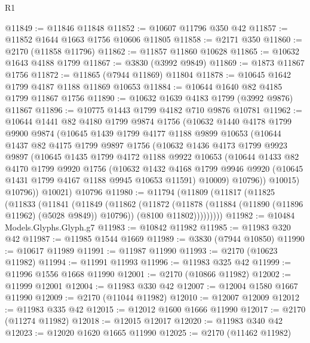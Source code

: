 \begin{lexlean}{R1}
\begin{coremodule}
@11849 := @11846 @11848
@11852 := @10607 @11796 @350 @42
@11857 := @11852 @1644 @1663 @1756 @10606 @11805
@11858 := @2171 @350
@11860 := @2170 (@11858 @11796)
@11862 := @11857 @11860 @10628
@11865 := @10632 @1643 @4188 @1799
@11867 := @3830 (@3992 @9849)
@11869 := @1873 @11867 @1756
@11872 := @11865 (@7944 @11869) @11804
@11878 := @10645 @1642 @1799 @4187 @1188 @11869 @10653
@11884 := @10644 @1640 @82 @4185 @1799 @11867 @1756
@11890 := @10632 @1639 @4183 @1799 (@3992 @9876) @11867
@11896 := @10775 @1443 @1799 @4182 @710 @9876 @10781
@11962 := @10644
    @1441
    @82
    @4180
    @1799
    @9874
    @1756
    (@10632
      @1440
      @4178
      @1799
      @9900
      @9874
      (@10645
        @1439
        @1799
        @4177
        @1188
        @9899
        @10653
        (@10644
          @1437
          @82
          @4175
          @1799
          @9897
          @1756
          (@10632
            @1436
            @4173
            @1799
            @9923
            @9897
            (@10645
              @1435
              @1799
              @4172
              @1188
              @9922
              @10653
              (@10644
                @1433
                @82
                @4170
                @1799
                @9920
                @1756
                (@10632
                  @1432
                  @4168
                  @1799
                  @9946
                  @9920
                  (@10645 @1431 @1799 @4167 @1188 @9945 @10653 @11591)
                  @10009)
                @10796))
            @10015)
          @10796))
      @10021)
    @10796
@11980 := @11794
    (@11809
      (@11817
        (@11825
          (@11833
            (@11841
              (@11849
                (@11862
                  (@11872
                    (@11878 (@11884 (@11890 (@11896 @11962) (@5028 @9849)) @10796))
                    (@8100 @11802)))))))))
@11982 := @10484 Models.Glyphs.Glyph.g7
@11983 := @10842 @11982
@11985 := @11983 @320 @42
@11987 := @11985 @1544 @1669
@11989 := @3830 (@7944 @10850)
@11990 := @10617 @11989
@11991 := @11987 @11990
@11993 := @2170 (@10623 @11982)
@11994 := @11991 @11993
@11996 := @11983 @325 @42
@11999 := @11996 @1556 @1668 @11990
@12001 := @2170 (@10866 @11982)
@12002 := @11999 @12001
@12004 := @11983 @330 @42
@12007 := @12004 @1580 @1667 @11990
@12009 := @2170 (@11044 @11982)
@12010 := @12007 @12009
@12012 := @11983 @335 @42
@12015 := @12012 @1600 @1666 @11990
@12017 := @2170 (@11274 @11982)
@12018 := @12015 @12017
@12020 := @11983 @340 @42
@12023 := @12020 @1620 @1665 @11990
@12025 := @2170 (@11462 @11982)

\end{coremodule}
\end{lexlean}
